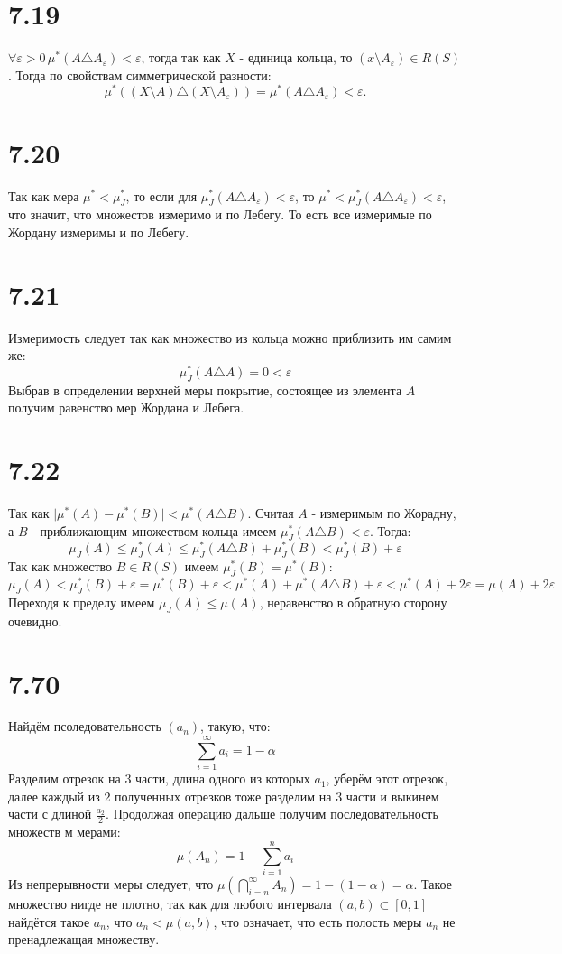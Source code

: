 \documentclass[12pt]{article}
\begin{document}
\section{7.19}
$\forall \varepsilon > 0 \, \mu^{\ast} (A \triangle A_{\varepsilon}) < \varepsilon$, тогда так как $X$ - единица кольца, то
$(x \setminus A_{\varepsilon}) \in R(S)$. Тогда по свойствам симметрической разности:
\[
    \mu^{\ast}  ((X \setminus A) \triangle (X \setminus A_{\varepsilon} )) = \mu^{\ast}  (A \triangle A_{\varepsilon} )< \varepsilon.
\]
\section{7.20}
Так как мера $\mu^{\ast} < \mu_{J}^{\ast}$, то если для $\mu^{\ast}_J (A \triangle A_{\varepsilon}) < \varepsilon$, то 
$\mu^{\ast} < \mu^{\ast}_J (A \triangle A_{\varepsilon}) < \varepsilon$, что значит, что множестов измеримо и по Лебегу. То есть 
все измеримые по Жордану измеримы и по Лебегу.
\section{7.21}
Измеримость следует так как множество из кольца можно приблизить им самим же: 
\[
    \mu^{\ast}_J (A \triangle A) = 0 < \varepsilon
\]
Выбрав в определении верхней меры покрытие, состоящее из элемента $A$ получим равенство мер Жордана и Лебега. 
\section{7.22}
Так как $\vert \mu^{\ast}(A) - \mu^{\ast}(B) \vert < \mu^{\ast} (A \triangle B)$. Считая $A$ - измеримым по Жорадну, 
а $B$ - приближающим множеством кольца имеем $\mu^{\ast}_J (A \triangle B) < \varepsilon$. Тогда:
\[
    \mu_J(A) \leq \mu^{\ast}_J(A) \leq \mu^{\ast}_J (A \triangle B) + \mu^{\ast}_J(B) < \mu^{\ast}_J(B) + \varepsilon
\]
Так как множество $B \in R(S)$ имеем $\mu^{\ast}_J(B) = \mu^{\ast}(B)$:
\[
    \mu_J(A) < \mu^{\ast}_J(B) + \varepsilon = \mu^{\ast}(B) + \varepsilon < \mu^{\ast}(A) + \mu^{\ast} (A \triangle B) + \varepsilon < 
    \mu^{\ast}(A) + 2\varepsilon = \mu(A) + 2\varepsilon
\] 
Переходя к пределу имеем $\mu_J(A) \leq \mu(A)$, неравенство в обратную сторону очевидно. 
\section{7.70}
Найдём псоледовательность $(a_n)$, такую, что: 
\[
    \sum_{i=1}^{\infty} a_i = 1 - \alpha
\] 
Разделим отрезок на 3 части, длина одного из которых $a_1$, уберём этот отрезок, далее каждый из 2 полученных отрезков тоже разделим на 
3 части и выкинем части с длиной $\frac{a_2}{2}$. Продолжая операцию дальше получим последовательность множеств м мерами: 
\[
    \mu(A_n) = 1 - \sum_{i=1}^{n} a_i 
\]  
Из непрерывности меры следует, что $\mu (\bigcap_{i=n}^{\infty} A_n) = 1 - ( 1 - \alpha) = \alpha$. Такое множество нигде не плотно, так 
как для любого интервала $(a, b) \subset [0, 1]$ найдётся такое $a_n$, что $a_n < \mu (a, b)$, что означает, что 
есть полость меры $a_n$ не пренадлежащая множеству.      
\end{document}
